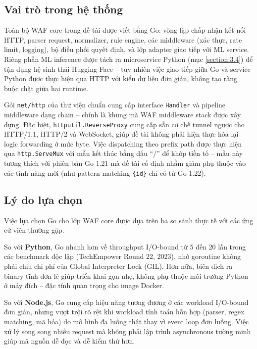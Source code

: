 \documentclass[../DoAn.tex]{subfiles}
\begin{document}
\subsection{Vai trò trong hệ thống}
\label{subsection:3.1.2}

Toàn bộ WAF core trong đề tài được viết bằng Go: vòng lặp chấp nhận kết nối
HTTP, parser request, normalizer, rule engine, các middleware (xác thực, rate
limit, logging), bộ điều phối quyết định, và lớp adapter giao tiếp với ML
service. Riêng phần ML inference được tách ra microservice Python (mục
\ref{section:3.4}) để tận dụng hệ sinh thái Hugging Face -- tuy nhiên việc
giao tiếp giữa Go và service Python được thực hiện qua HTTP với kiểu dữ liệu
đơn giản, không tạo ràng buộc chặt giữa hai runtime.

Gói \texttt{net/http} của thư viện chuẩn cung cấp interface \texttt{Handler}
và pipeline middleware dạng chain -- chính là khung mà WAF middleware stack
được xây dựng. Đặc biệt, \texttt{httputil.ReverseProxy} cung cấp sẵn cơ chế
tunnel ngược cho HTTP/1.1, HTTP/2 và WebSocket, giúp đề tài không phải hiện
thực hóa lại logic forwarding ở mức byte. Việc dispatching theo prefix path
được thực hiện qua \texttt{http.ServeMux} với mẫu kết thúc bằng dấu ``/'' để
khớp tiền tố -- mẫu này tương thích với phiên bản Go 1.21 mà đề tài cố định
nhằm giảm phụ thuộc vào các tính năng mới (như pattern matching
\texttt{\{id\}} chỉ có từ Go 1.22).

\subsection{Lý do lựa chọn}
\label{subsection:3.1.3}

Việc lựa chọn Go cho lớp WAF core được dựa trên ba so sánh thực tế với các
ứng cử viên thường gặp.

So với \textbf{Python}, Go nhanh hơn về throughput I/O-bound từ 5 đến 20 lần
trong các benchmark độc lập (TechEmpower Round 22, 2023), nhờ goroutine
không phải chịu chi phí của Global Interpreter Lock (GIL). Hơn nữa, biên dịch
ra binary tĩnh đơn lẻ giúp triển khai gọn nhẹ, không phụ thuộc môi trường
Python ở máy đích -- đặc tính quan trọng cho image Docker.

So với \textbf{Node.js}, Go cung cấp hiệu năng tương đương ở các workload
I/O-bound đơn giản, nhưng vượt trội rõ rệt khi workload tính toán hỗn hợp
(parser, regex matching, mã hóa) do mô hình đa luồng thật thay vì event loop
đơn luồng. Việc xử lý song song nhiều request mà không phải lập trình
asynchronous tường minh giúp mã nguồn dễ đọc và dễ kiểm thử hơn.
\end{document}

